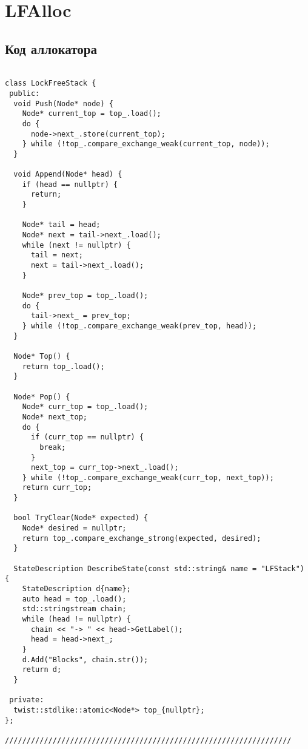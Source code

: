 \chapter{LFAlloc}\label{app:A}

\newenvironment{codebr}{\captionsetup{type=listing}}{}

\section{Код аллокатора}


\begin{codebr}
	
	\begin{verbatim}
    
class LockFreeStack {
 public:
  void Push(Node* node) {
    Node* current_top = top_.load();
    do {
      node->next_.store(current_top);
    } while (!top_.compare_exchange_weak(current_top, node));
  }

  void Append(Node* head) {
    if (head == nullptr) {
      return;
    }

    Node* tail = head;
    Node* next = tail->next_.load();
    while (next != nullptr) {
      tail = next;
      next = tail->next_.load();
    }

    Node* prev_top = top_.load();
    do {
      tail->next_ = prev_top;
    } while (!top_.compare_exchange_weak(prev_top, head));
  }

  Node* Top() {
    return top_.load();
  }

  Node* Pop() {
    Node* curr_top = top_.load();
    Node* next_top;
    do {
      if (curr_top == nullptr) {
        break;
      }
      next_top = curr_top->next_.load();
    } while (!top_.compare_exchange_weak(curr_top, next_top));
    return curr_top;
  }

  bool TryClear(Node* expected) {
    Node* desired = nullptr;
    return top_.compare_exchange_strong(expected, desired);
  }

  StateDescription DescribeState(const std::string& name = "LFStack") {
    StateDescription d{name};
    auto head = top_.load();
    std::stringstream chain;
    while (head != nullptr) {
      chain << "-> " << head->GetLabel();
      head = head->next_;
    }
    d.Add("Blocks", chain.str());
    return d;
  }

 private:
  twist::stdlike::atomic<Node*> top_{nullptr};
};

//////////////////////////////////////////////////////////////////


\end{verbatim}
\end{codebr}
